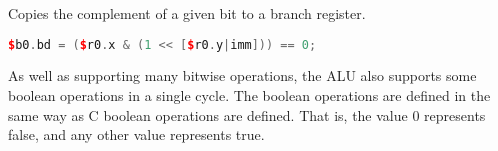 \noindent Copies the complement of a given bit to a branch register.

\begin{lstlisting}[numbers=none, basicstyle=\ttfamily\footnotesize, language=C++]
$b0.bd = ($r0.x & (1 << [$r0.y|imm])) == 0;
\end{lstlisting}

As well as supporting many bitwise operations, the \rvex{} ALU also supports
some boolean operations in a single cycle. The boolean operations are defined in
the same way as C boolean operations are defined. That is, the value 0
represents false, and any other value represents true.
\vskip 10pt
\noindent\begin{minipage}{\textwidth}
\label{opc:ANDL}
\noindent\textbf{\footnotesize\texttt{}}

\noindent\textbf{\footnotesize\texttt{}}


\end{minipage}
